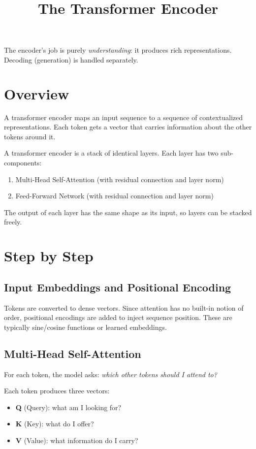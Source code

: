 \documentclass[12pt]{article}
\title{The Transformer Encoder}
\author{}
\date{}
\begin{document}
\maketitle

The encoder's job is purely \textit{understanding}: it produces rich representations. Decoding (generation) is handled separately.

\section{Overview}

A transformer encoder maps an input sequence to a sequence of contextualized representations. Each token gets a vector that carries information about the other tokens around it.

A transformer encoder is a stack of identical layers. Each layer has two sub-components:

\begin{enumerate}
    \item Multi-Head Self-Attention (with residual connection and layer norm)
    \item Feed-Forward Network (with residual connection and layer norm)
\end{enumerate}

The output of each layer has the same shape as its input, so layers can be stacked freely.

\section{Step by Step}

\subsection{Input Embeddings and Positional Encoding}

Tokens are converted to dense vectors. Since attention has no built-in notion of order, positional encodings are added to inject sequence position. These are typically sine/cosine functions or learned embeddings.

\subsection{Multi-Head Self-Attention}

For each token, the model asks: \textit{which other tokens should I attend to?}

Each token produces three vectors:
\begin{itemize}
    \item \textbf{Q} (Query): what am I looking for?
    \item \textbf{K} (Key): what do I offer?
    \item \textbf{V} (Value): what information do I carry?
\end{itemize}
\end{document}
